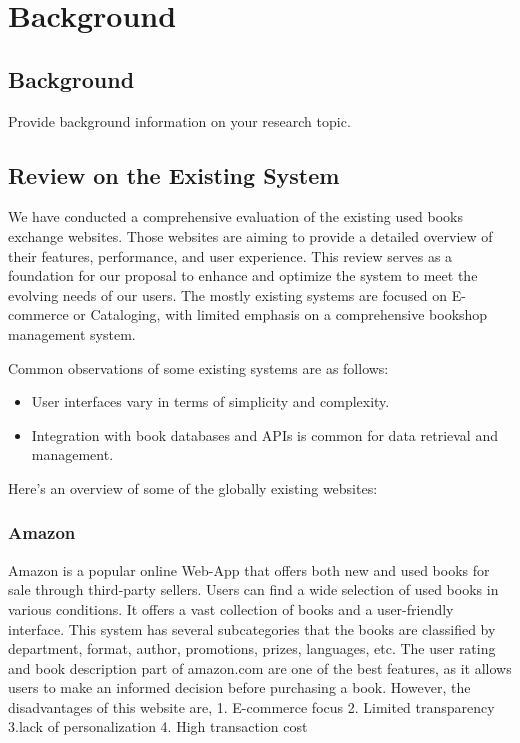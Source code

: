 \documentclass{article}
\begin{document}
\newpage
\section{Background}
\subsection{Background}
Provide background information on your research topic.

\newpage
\subsection{Review on the Existing System}
We have conducted a comprehensive evaluation of the existing used books exchange websites. Those websites are aiming to provide a detailed overview of their features, performance, and user experience. This review serves as a foundation for our proposal to enhance and optimize the system to meet the evolving needs of our users. The mostly existing systems are focused on E-commerce or Cataloging, with limited emphasis on a comprehensive bookshop management system.

Common observations of some existing systems are as follows:
\begin{itemize}
    \item User interfaces vary in terms of simplicity and complexity.
    \item Integration with book databases and APIs is common for data retrieval and management.
\end{itemize}

Here's an overview of some of the globally existing websites:

\subsubsection{Amazon}
Amazon is a popular online Web-App that offers both new and used books for sale through third-party sellers. Users can find a wide selection of used books in various conditions. It offers a vast collection of books and a user-friendly interface. This system has several subcategories that the books are classified by department, format, author, promotions, prizes, languages, etc. The user rating and book description part of amazon.com are one of the best features, as it allows users to make an informed decision before purchasing a book. 
However, the disadvantages of this website are,
1. E-commerce focus
2. Limited transparency
3.lack of personalization
4. High transaction cost
\end{document}
